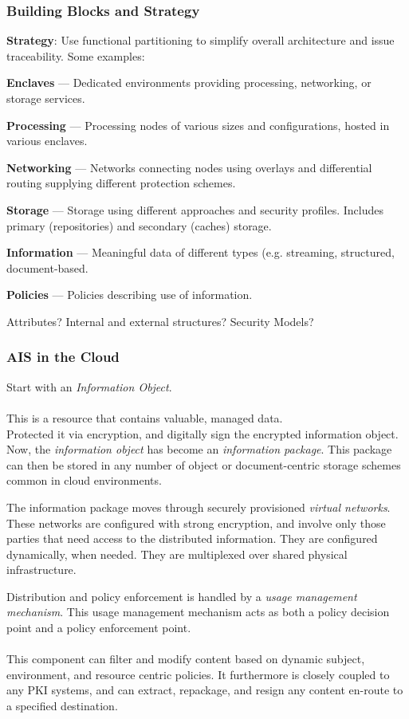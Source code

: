 \documentclass[t,handout]{beamer}
\begin{document}
\begin{frame}
\frametitle{Building Blocks and Strategy}
{\bf Strategy}: Use functional partitioning to simplify overall architecture and issue traceability. Some examples:
\begin{itemize}
{\small 
\item {\bf Enclaves} --- Dedicated environments providing processing, networking, or storage services.
\item {\bf Processing} --- Processing nodes of various sizes and configurations, hosted in various enclaves.
\item {\bf Networking} --- Networks connecting nodes using overlays and differential routing supplying different protection schemes.
\item {\bf Storage} --- Storage using different approaches and security profiles.  Includes primary (repositories) and secondary (caches) storage.
\item {\bf Information} --- Meaningful data of different types (e.g. streaming, structured, document-based.
\item {\bf Policies} --- Policies describing use of information.
}
\end{itemize}
Attributes? Internal and external structures? Security Models?
\end{frame}

\begin{frame}
\frametitle{AIS in the Cloud}
Start with an {\sl Information Object}.\\~\\
This is a resource that contains valuable, managed data.\\
Protected it via encryption, and digitally sign the encrypted information object. \\
Now, the {\sl information object} has become an {\sl information package}.  This package can then be stored in any number of object or document-centric storage schemes common in cloud environments.
\end{frame}

\begin{frame}
The information package moves through securely provisioned {\sl virtual networks}.  These networks are configured with strong encryption, and involve only those parties that need access to the distributed information.  They are configured dynamically, when needed.  They are multiplexed over shared physical infrastructure.
\end{frame}

\begin{frame}
Distribution and policy enforcement is handled by a {\sl usage management mechanism}.  This usage management mechanism acts as both a policy decision point and a policy enforcement point. \\~\\
This component can filter and modify content based on dynamic subject, environment, and resource centric policies. It furthermore is closely coupled to any PKI systems, and can extract, repackage, and resign any content en-route to a specified destination.
\end{frame}
\end{document}
